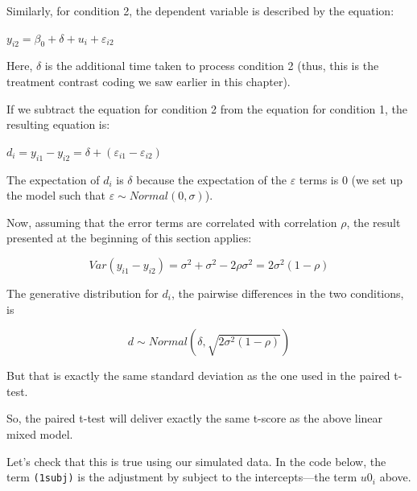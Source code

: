 \documentclass[12pt,]{krantz}
\newenvironment{Shaded}{\begin{snugshade}}{\end{snugshade}}
\newcommand{\DataTypeTok}[1]{\textcolor[rgb]{0.13,0.29,0.53}{#1}}
\newcommand{\DecValTok}[1]{\textcolor[rgb]{0.00,0.00,0.81}{#1}}
\newcommand{\KeywordTok}[1]{\textcolor[rgb]{0.13,0.29,0.53}{\textbf{#1}}}
\newcommand{\NormalTok}[1]{#1}
\newcommand{\OperatorTok}[1]{\textcolor[rgb]{0.81,0.36,0.00}{\textbf{#1}}}
\newcommand{\StringTok}[1]{\textcolor[rgb]{0.31,0.60,0.02}{#1}}
\begin{document}
Similarly, for condition 2, the dependent variable is described by the equation:

\(y_{i2} = \beta_0 + \delta + u_i + \varepsilon_{i2}\)

Here, \(\delta\) is the additional time taken to process condition 2 (thus, this is the treatment contrast coding we saw earlier in this chapter).

If we subtract the equation for condition 2 from the equation for condition 1, the resulting equation is:

\(d_i=y_{i1} - y_{i2}= \delta + (\varepsilon_{i1}-\varepsilon_{i2})\)

The expectation of \(d_i\) is \(\delta\) because the expectation of the \(\varepsilon\) terms is 0 (we set up the model such that \(\varepsilon \sim Normal(0,\sigma)\)).

Now, assuming that the error terms are correlated with correlation \(\rho\), the result presented at the beginning of this section applies:

\begin{equation}
Var(y_{i1}-y_{i2}) = \sigma^2 + \sigma^2-2\rho\sigma^2=2\sigma^2(1-\rho)
\end{equation}

The generative distribution for \(d_i\), the pairwise differences in the two conditions, is

\begin{equation}
d \sim Normal(\delta, \sqrt{2\sigma^2(1-\rho)})
\end{equation}

But that is exactly the same standard deviation as the one used in the paired t-test.

So, the paired t-test will deliver exactly the same t-score as the above linear mixed model.

Let's check that this is true using our simulated data. In the code below, the term \texttt{(1\textbar{}subj)} is the adjustment by subject to the intercepts---the term \(u0_i\) above.

\begin{Shaded}
\end{Shaded}
\end{document}
